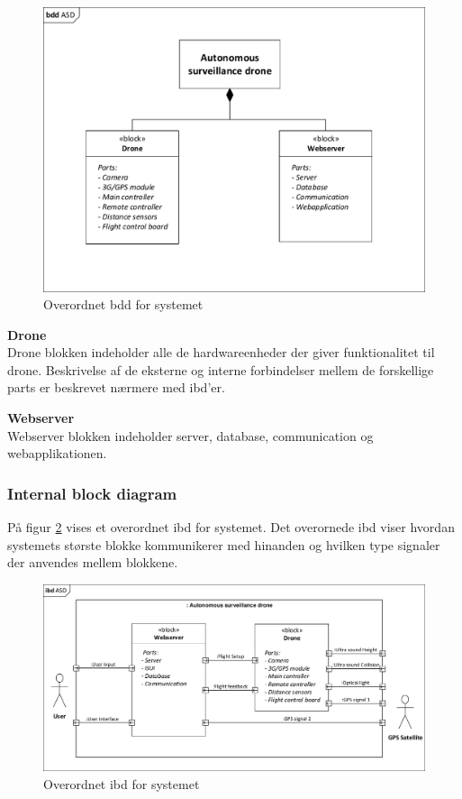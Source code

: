\begin{figure}[H]
	\centering
	\includegraphics[width=1.0\textwidth]{Billeder/Projektbeskrivelse/bdd_overordnet.pdf}
	\caption{Overordnet bdd for systemet}
	\label{fig:bdd_asd}
\end{figure}

\textbf{Drone} \\
Drone blokken indeholder alle de hardwareenheder der giver funktionalitet til drone. Beskrivelse af de eksterne og interne forbindelser mellem de forskellige parts er beskrevet nærmere med ibd'er.

\textbf{Webserver} \\
Webserver blokken indeholder server, database, communication og webapplikationen.

\newpage

\subsubsection*{Internal block diagram}
\vspace{-0.3cm}	

På figur \ref{fig:ibd_asd} vises et overordnet ibd for systemet. Det overornede ibd viser hvordan systemets største blokke kommunikerer med hinanden og hvilken type signaler der anvendes mellem blokkene. 

\begin{figure}[H]
	\centering
	\includegraphics[width=1\textwidth]{Billeder/Projektbeskrivelse/ibd1_overordnet.pdf}
	\caption{Overordnet ibd for systemet}
	\label{fig:ibd_asd}
\end{figure}

